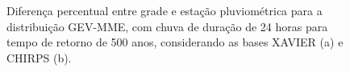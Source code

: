 \documentclass[
]{agujournal2019}
\begin{document}
\begin{figure}

\begin{minipage}{\linewidth}



\end{minipage}%
\newline
\begin{minipage}{\linewidth}



\end{minipage}%

\caption{\label{fig-Figura25}Diferença percentual entre grade e estação
pluviométrica para a distribuição GEV-MME, com chuva de duração de 24
horas para tempo de retorno de 500 anos, considerando as bases XAVIER
(a) e CHIRPS (b).}

\end{figure}%
\end{document}
